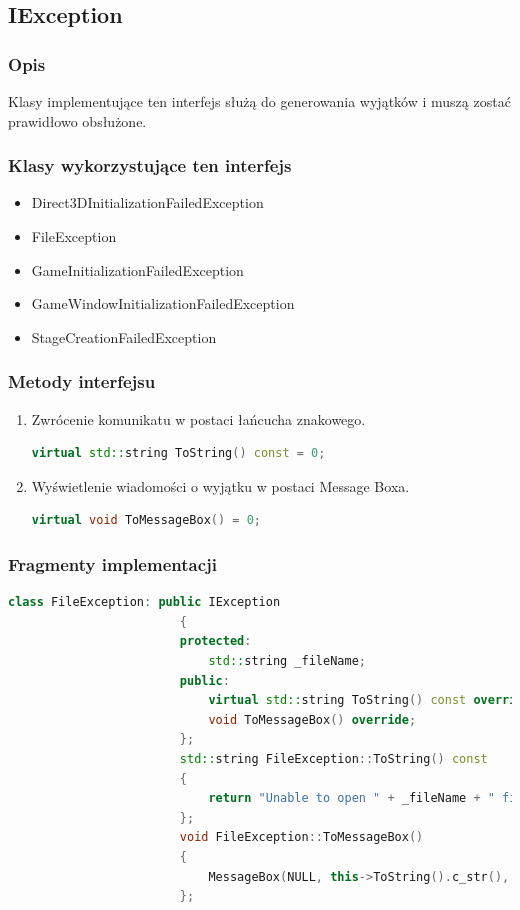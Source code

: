 \documentclass[a4paper,twoside]{article}
\begin{document}
				\subsection{IException}
					\subsubsection{Opis}
						Klasy implementujące ten interfejs służą do generowania wyjątków i muszą zostać prawidłowo obsłużone.
					\subsubsection{Klasy wykorzystujące ten interfejs}
					\begin{itemize}
						\item Direct3DInitializationFailedException
						\item FileException
						\item GameInitializationFailedException
						\item GameWindowInitializationFailedException
						\item StageCreationFailedException
					\end{itemize}
					\subsubsection{Metody interfejsu}
					\begin{enumerate}
						\item Zwrócenie komunikatu w postaci łańcucha znakowego.
						\begin{lstlisting}[language=C++]
							virtual std::string ToString() const = 0;
						\end{lstlisting}
						\item Wyświetlenie wiadomości o wyjątku w postaci Message Boxa.
						\begin{lstlisting}[language=C++]
							virtual void ToMessageBox() = 0;
						\end{lstlisting}
					\end{enumerate}
					\subsubsection{Fragmenty implementacji}
					\begin{lstlisting}[language=C++]
						class FileException: public IException
						{
						protected:
							std::string _fileName;
						public:
							virtual std::string ToString() const override;
							void ToMessageBox() override;
						};
						std::string FileException::ToString() const
						{
							return "Unable to open " + _fileName + " file";
						};
						void FileException::ToMessageBox()
						{
							MessageBox(NULL, this->ToString().c_str(), "Error!", MB_OK | MB_ICONERROR);
						};
						
					\end{lstlisting}
\end{document}
